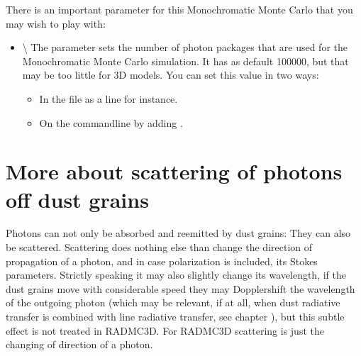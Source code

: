 \documentclass[letterpaper,10pt,english]{sphinxmanual}
\begin{document}
There is an important parameter for this Monochromatic Monte Carlo that you
may wish to play with:
\begin{itemize}
\item {} 
\textbackslash{}
The parameter  sets the number of photon packages
that are used for the Monochromatic Monte Carlo simulation. It has as
default 100000, but that may be too little for 3\sphinxhyphen{}D models. You can set
this value in two ways:
\begin{itemize}
\item {} 
In the  file as a line  for instance.

\item {} 
On the command\sphinxhyphen{}line by adding .

\end{itemize}

\end{itemize}


\section{More about scattering of photons off dust grains}
\label{\detokenize{dustradtrans:more-about-scattering-of-photons-off-dust-grains}}\label{\detokenize{dustradtrans:sec-scattering}}
Photons can not only be absorbed and re\sphinxhyphen{}emitted by dust grains: They can also be
scattered. Scattering does nothing else than change the direction of propagation
of a photon, and in case polarization is included, its Stokes
parameters. Strictly speaking it may also slightly change its wavelength, if the
dust grains move with considerable speed they may Doppler\sphinxhyphen{}shift the wavelength
of the outgoing photon (which may be relevant, if at all, when dust radiative
transfer is combined with line radiative transfer, see chapter
{\hyperref[\detokenize{lineradtrans:chap-line-transfer}]{}}), but this subtle effect is not treated in
RADMC\sphinxhyphen{}3D. For RADMC\sphinxhyphen{}3D scattering is just the changing of direction of a photon.
\end{document}
